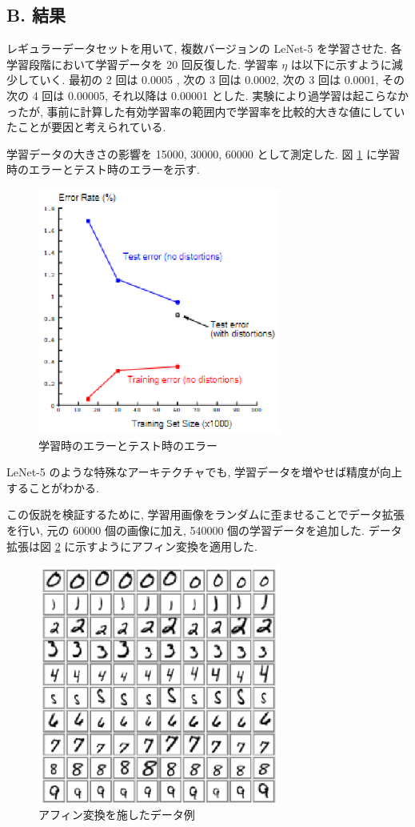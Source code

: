 \documentclass[twocolumn]{jarticle}     %
\begin{document}
\subsection*{B. 結果}
レギュラーデータセットを用いて, 複数バージョンの LeNet-5 を学習させた. 
各学習段階において学習データを 20 回反復した. 
学習率 $\eta$ は以下に示すように減少していく. 
最初の 2 回は 0.0005 , 次の 3 回は 0.0002, 次の 3 回は 0.0001, その次の 4 回は 0.00005, それ以降は 0.00001 とした. 
実験により過学習は起こらなかったが, 事前に計算した有効学習率の範囲内で学習率を比較的大きな値にしていたことが要因と考えられている.
\par
学習データの大きさの影響を 15000, 30000, 60000 として測定した. 図 \ref{fig:6} に学習時のエラーとテスト時のエラーを示す.

\begin{figure}[t]
  \centering
  \includegraphics[width=80mm]{assets/6.eps}
  \caption{学習時のエラーとテスト時のエラー}
  \label{fig:6}
\end{figure}
LeNet-5 のような特殊なアーキテクチャでも, 学習データを増やせば精度が向上することがわかる.
\par
この仮説を検証するために, 学習用画像をランダムに歪ませることでデータ拡張を行い, 元の 60000 個の画像に加え, 540000 個の学習データを追加した. データ拡張は図 \ref{fig:7} に示すようにアフィン変換を適用した.
\begin{figure}[t]
  \centering
  \includegraphics[width=80mm]{assets/7.eps}
  \caption{アフィン変換を施したデータ例}
  \label{fig:7}
\end{figure}
\end{document}
